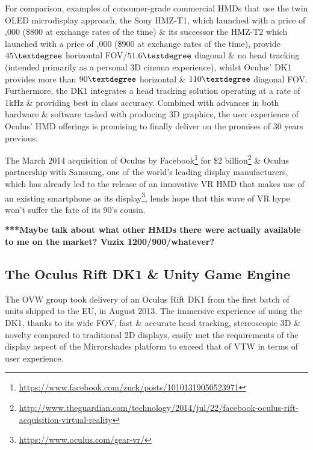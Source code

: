 For comparison, examples of consumer-grade commercial HMDs that use the twin OLED microdisplay approach, the Sony HMZ-T1, which launched with a price of ,000 (\$800 at exchange rates of the time) \& its successor the HMZ-T2 which launched with a price of ,000 (\$900 at exchange rates of the time), provide $45\textdegree$ horizontal FOV/$51.6\textdegree$ diagonal \& no head tracking (intended primarily as a personal 3D cinema experience), whilst Oculus' DK1 provides more than $90\textdegree$ horizontal \& $110\textdegree$ diagonal FOV. Furthermore, the DK1 integrates a head tracking solution operating at a rate of 1kHz \& providing best in class accuracy. Combined with advances in both hardware \& software tasked with producing 3D graphics, the user experience of Oculus' HMD offerings is promising to finally deliver on the promises of 30 years previous.

The March 2014 acquisition of Oculus by Facebook\footnote{\url{https://www.facebook.com/zuck/posts/10101319050523971}} for \$2 billion\footnote{\url{http://www.theguardian.com/technology/2014/jul/22/facebook-oculus-rift-acquisition-virtual-reality}} \& Oculus partnership with Samsung, one of the world's leading display manufacturers, which has already led to the release of an innovative VR HMD that makes use of an existing smartphone as its display\footnote{\url{https://www.oculus.com/gear-vr/}}, lends hope that this wave of VR hype won't suffer the fate of its 90's cousin.

\textbf{***Maybe talk about what other HMDs there were actually available to me on the market? Vuzix 1200/900/whatever?}



\subsection{The Oculus Rift DK1 \& Unity Game Engine}

The OVW group took delivery of an Oculus Rift DK1 from the first batch of units shipped to the EU, in August 2013. The immersive experience of using the DK1, thanks to its wide FOV, fast \& accurate head tracking, stereoscopic 3D \& novelty compared to traditional 2D displays, easily met the requirements of the display aspect of the Mirrorshades platform to exceed that of VTW in terms of user experience.

